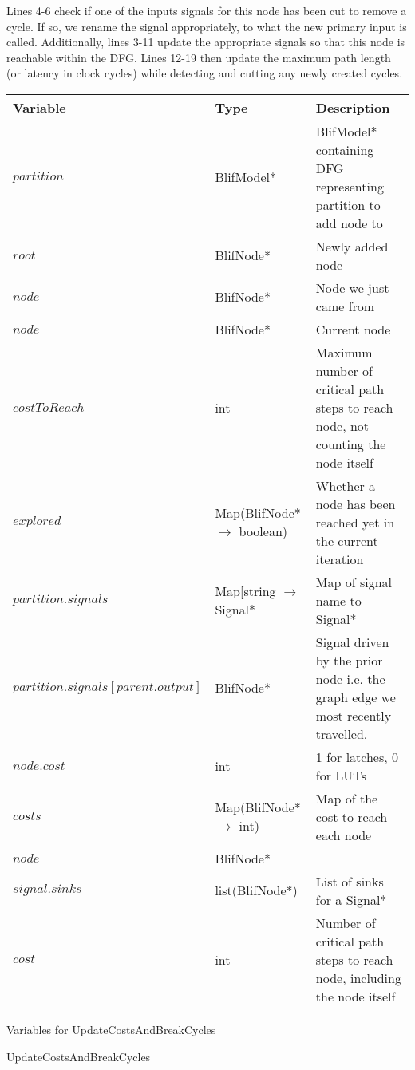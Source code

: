 \documentclass[12pt,final,oneside]{article} %
\begin{document}
Lines 4-6 check if one of the inputs signals for this node has been cut to remove a cycle. If so, we rename the signal appropriately, to what the new primary input is called.
Additionally, lines 3-11 update the appropriate signals so that this node is reachable within the \ac{DFG}.
Lines 12-19 then update the maximum path length (or latency in clock cycles) while detecting and cutting any newly created cycles.
\newpage

\begin{algorithm}
    \begin{center}
        \begin{tabularx}{\linewidth}{llX}
        \toprule
        Variable & Type & Description\\
        \midrule
        $partition$ & BlifModel* & BlifModel* containing DFG representing partition to add node to\\
        $root$ & BlifNode* & Newly added node\\
        $node$ & BlifNode* & Node we just came from\\
        $node$ & BlifNode* & Current node\\
        $costToReach$ & int & Maximum number of critical path steps to reach node, not counting the node itself \\
        $explored$ & Map(BlifNode* $\to$ boolean) & Whether a node has been reached yet in the current iteration \\ 
        $partition.signals$ & Map[string $\to$ Signal* & Map of signal name to Signal* \\
        $partition.signals[parent.output]$ & BlifNode* & Signal driven by the prior node i.e. the graph edge we most recently travelled. \\
        $node.cost$ & int & 1 for latches, 0 for LUTs \\
        $costs$ & Map(BlifNode* $\to$ int) & Map of the cost to reach each node \\
        $node$ & BlifNode* & \\
        $signal.sinks$ & list(BlifNode*) & List of sinks for a Signal* \\
        $cost$ & int & Number of critical path steps to reach node, including the node itself \\
        \bottomrule
        \end{tabularx}
        \caption{Variables for UpdateCostsAndBreakCycles}
        \label{varUpdatecosts}
    \end{center}
   \caption{UpdateCostsAndBreakCycles}\label{updatecosts}

\end{algorithm}
\end{document}
